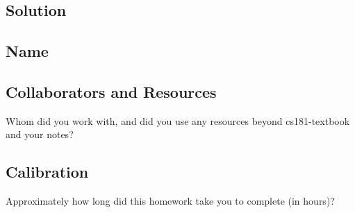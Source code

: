 \documentclass[submit]{harvardml}
\begin{document}
\subsection*{Solution}

\newpage
\subsection*{Name}

\subsection*{Collaborators and Resources}
Whom did you work with, and did you use any resources beyond cs181-textbook and your notes?

\subsection*{Calibration}
Approximately how long did this homework take you to complete (in hours)? 
\end{document}
